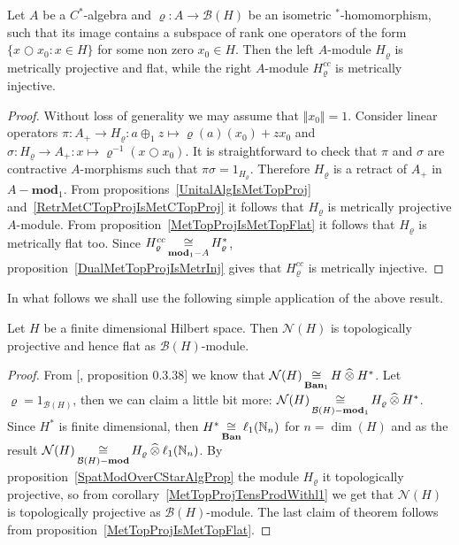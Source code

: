 \begin{proposition}\label{SpatModOverCStarAlgProp} Let $A$ be a $C^*$-algebra
and $\varrho:A\to\mathcal{B}(H)$ be an isometric ${}^*$-homomorphism, such that
its image contains a subspace of rank one operators of the 
form $ \{x\bigcirc x_0:x\in H \}$ for some non zero $x_0\in H$. 
Then the left $A$-module $H_\varrho$ is metrically projective and flat, 
while the  right $A$-module $H_\varrho^{cc}$ is metrically injective.
\end{proposition}
\begin{proof} Without loss of generality we may assume that $\Vert x_0\Vert=1$.
Consider linear operators 
$\pi:A_+\to H_\varrho:a\oplus_1 z\mapsto \varrho(a)(x_0)+zx_0$ 
and $\sigma:H_\varrho\to A_+:x\mapsto \varrho^{-1}(x\bigcirc x_0)$. 
It is straightforward to check that $\pi$ and
$\sigma$ are contractive $A$-morphisms such that $\pi\sigma=1_{H_\varrho}$.
Therefore $H_\varrho$ is a retract of $A_+$ in $A-\mathbf{mod}_1$. From
propositions~\ref{UnitalAlgIsMetTopProj} and~\ref{RetrMetCTopProjIsMetCTopProj} 
it follows that $H_\varrho$ is metrically projective $A$-module. From
proposition~\ref{MetTopProjIsMetTopFlat} it follows that $H_\varrho$ is
metrically flat too. Since $H_\varrho^{cc}\mathop{\mathbin{\cong}}\limits_{\mathbf{mod}_1-A}H_\varrho^*$,
proposition~\ref{DualMetTopProjIsMetrInj} gives that $H_\varrho^{cc}$ is
metrically injective.
\end{proof}

In what follows we shall use the following simple application of the above
result.

\begin{proposition}\label{FinDimNHModTopProjFlat} Let $H$ be a finite
dimensional Hilbert space. Then $\mathcal{N}(H)$ is topologically projective and
hence flat as $\mathcal{B}(H)$-module.
\end{proposition}
\begin{proof} From [\cite{HelBanLocConvAlg}, proposition 0.3.38] we know that
$\mathcal{N}(H)\mathop{\mathbin{\cong}}\limits_{\mathbf{Ban}_1}H\mathbin{\widehat{\otimes}} H^*$. Let
$\varrho=1_{\mathcal{B}(H)}$, then we can claim a little bit more:
$\mathcal{N}(H)\mathop{\mathbin{\cong}}\limits_{\mathcal{B}(H)-\mathbf{mod}_1} H_\varrho\mathbin{\widehat{\otimes}} H^*$.
Since $H^*$ is finite dimensional, then
$H^*\mathop{\mathbin{\cong}}\limits_{\mathbf{Ban}}\ell_1(\mathbb{N}_n)$ for $n=\dim(H)$ and as the result
$\mathcal{N}(H)\mathop{\mathbin{\cong}}\limits_{\mathcal{B}(H)-\mathbf{mod}}
H_\varrho\mathbin{\widehat{\otimes}}\ell_1(\mathbb{N}_n)$. By
proposition~\ref{SpatModOverCStarAlgProp} the module $H_\varrho$ it
topologically projective, so from corollary~\ref{MetTopProjTensProdWithl1} we
get that $\mathcal{N}(H)$ is topologically projective as
$\mathcal{B}(H)$-module. The last claim of theorem follows from
proposition~\ref{MetTopProjIsMetTopFlat}.
\end{proof}

